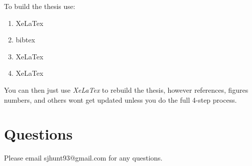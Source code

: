 To build the thesis use:

\begin{enumerate}
\item XeLaTex
\item bibtex
\item XeLaTex
\item XeLaTex
\end{enumerate}

You can then just use \textit{XeLaTex} to rebuild the thesis, however references, figures numbers, and others wont get updated unless you do the full 4-step process.


 \section{Questions}
 
 Please email sjhunt93@gmail.com for any questions.


